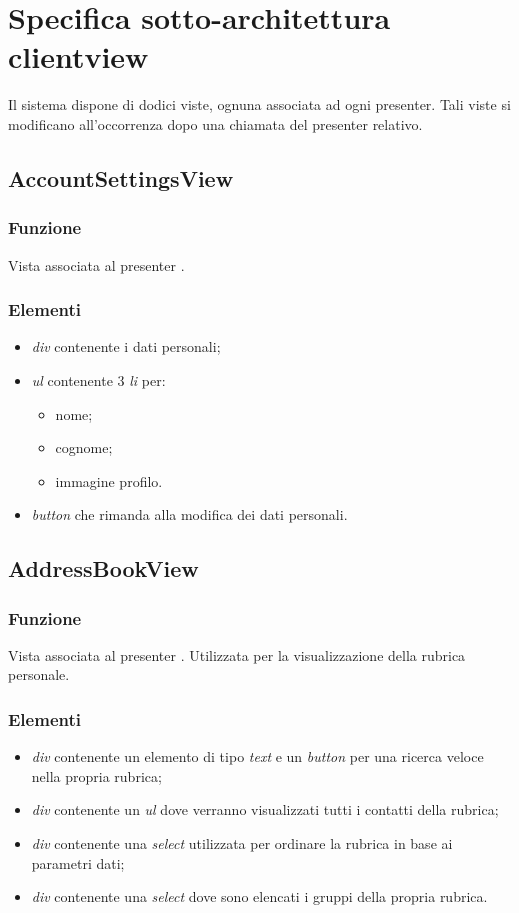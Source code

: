 \clearpage

\section{Specifica sotto-architettura clientview}\label{sec:clientviewarchitecture}
Il sistema dispone di dodici viste, ognuna associata ad ogni presenter. Tali viste si modificano all'occorrenza dopo una chiamata del presenter relativo.

\subsection{AccountSettingsView}
\subsubsection*{Funzione}
Vista associata al presenter .
\subsubsection*{Elementi}
\begin{itemize}
\item \textit{div} contenente i dati personali;
\item \textit{ul} contenente 3 \textit{li} per:
\begin{itemize}
\item nome;
\item cognome;
\item immagine profilo.
\end{itemize}
\item \textit{button} che rimanda alla modifica dei dati personali.
\end{itemize}

\subsection{AddressBookView}
\subsubsection*{Funzione}
Vista associata al presenter . Utilizzata per la visualizzazione della rubrica personale.
\subsubsection*{Elementi}
\begin{itemize}
\item \textit{div} contenente un elemento di tipo \textit{text} e un \textit{button} per una ricerca veloce nella propria rubrica;
\item \textit{div} contenente un \textit{ul} dove verranno visualizzati tutti i contatti della rubrica;
\item \textit{div} contenente una \textit{select} utilizzata per ordinare la rubrica in base ai parametri dati;
\item \textit{div} contenente una \textit{select} dove sono elencati i gruppi della propria rubrica.
\end{itemize}

